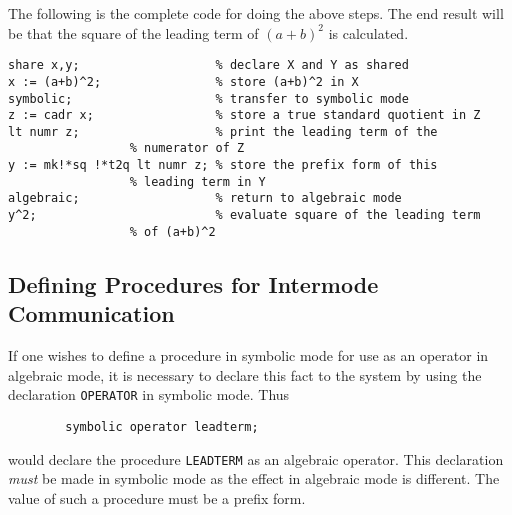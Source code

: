 The following is the complete code for doing the above steps. The end
result will be that the square of the leading term of $(a+b)^{2}$ is
calculated.

\begin{verbatim}
share x,y;                   % declare X and Y as shared
x := (a+b)^2;                % store (a+b)^2 in X
symbolic;                    % transfer to symbolic mode
z := cadr x;                 % store a true standard quotient in Z
lt numr z;                   % print the leading term of the
			     % numerator of Z
y := mk!*sq !*t2q lt numr z; % store the prefix form of this
			     % leading term in Y
algebraic;                   % return to algebraic mode
y^2;                         % evaluate square of the leading term
			     % of (a+b)^2
\end{verbatim}

\subsection{Defining Procedures for Intermode Communication}

If one wishes to define a procedure in symbolic mode for use as an
operator in algebraic mode, it is necessary to declare this fact to the
system by using the declaration {\tt OPERATOR} in
symbolic mode. Thus
\begin{verbatim}
        symbolic operator leadterm;
\end{verbatim}
would declare the procedure {\tt LEADTERM} as an algebraic operator. This
declaration {\em must\/} be made in symbolic mode as the effect in algebraic
mode is different.  The value of such a procedure must be a prefix form.


